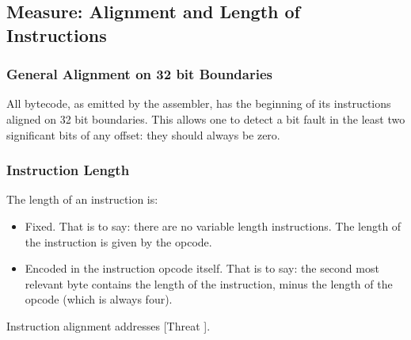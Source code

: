 \subsection{Measure: Alignment and Length of Instructions}

\subsubsection{General Alignment on 32 bit Boundaries}

All bytecode, as emitted by the assembler, has the beginning of its
instructions aligned on 32 bit boundaries. This allows one to detect
a bit fault in the least two significant bits of any offset: they should 
always be zero.

\subsubsection{Instruction Length}

The length of an instruction is:

\begin{itemize}
\item Fixed. That is to say: there are no variable length instructions.
The length of the instruction is given by the opcode.
\item Encoded in the instruction opcode itself. That is to say: the
second most relevant byte contains the length of the instruction, minus
the length of the opcode (which is always four).
\end{itemize}

Instruction alignment addresses [Threat \thethreatbcupset].
